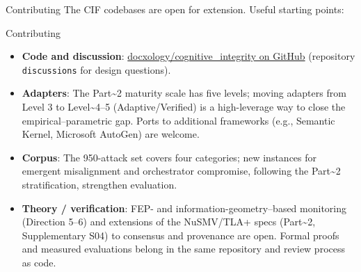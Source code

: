 \documentclass[
  ignorenonframetext,
]{beamer}
\providecommand{\tightlist}{%
  \setlength{\itemsep}{0pt}\setlength{\parskip}{0pt}}
\begin{document}
\begin{frame}{Contributing}
\protect{}\label{contributing}
The CIF codebases are open for extension. Useful starting points:

\end{frame}

\begin{frame}{Contributing}
\begin{itemize}
\tightlist
\item
  \textbf{Code and discussion}:
  \href{https://github.com/docxology/cognitive_integrity}{docxology/cognitive\_integrity
  on GitHub} (repository \texttt{discussions} for design questions).
\item
  \textbf{Adapters}: The Part\textasciitilde2 maturity scale has five
  levels; moving adapters from Level 3 to Level\textasciitilde4--5
  (Adaptive/Verified) is a high-leverage way to close the
  empirical--parametric gap. Ports to additional frameworks (e.g.,
  Semantic Kernel, Microsoft AutoGen) are welcome.
\item
  \textbf{Corpus}: The 950-attack set covers four categories; new
  instances for emergent misalignment and orchestrator compromise,
  following the Part\textasciitilde2 stratification, strengthen
  evaluation.
\item
  \textbf{Theory / verification}: FEP- and information-geometry--based
  monitoring (Direction 5--6) and extensions of the NuSMV/TLA+ specs
  (Part\textasciitilde2, Supplementary S04) to consensus and provenance
  are open. Formal proofs and measured evaluations belong in the same
  repository and review process as code.
\end{itemize}
\end{frame}
\end{document}

